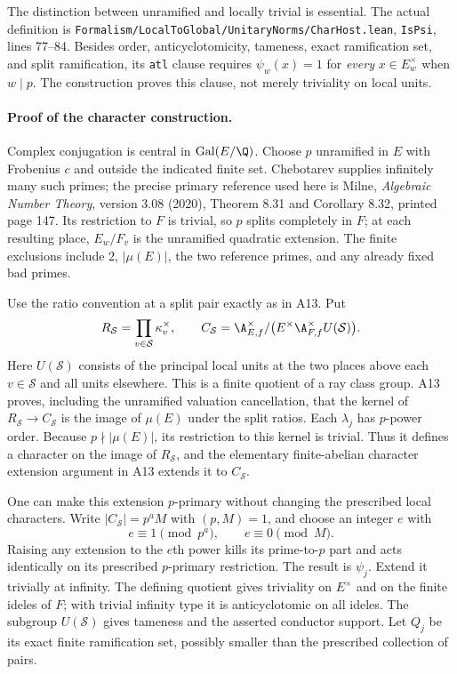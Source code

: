 The distinction between unramified and locally trivial is essential.
The actual definition is
\texttt{Formalism/LocalToGlobal/UnitaryNorms/CharHost.lean},
\texttt{IsPsi}, lines 77--84.  Besides order, anticyclotomicity,
tameness, exact ramification set, and split ramification, its
\texttt{atl} clause requires $\psi_w(x)=1$ for \emph{every}
$x\in E_w^\times$ when $w\mid p$.  The construction proves this clause,
not merely triviality on local units.

\paragraph{Proof of the character construction.}
Complex conjugation is central in $\operatorname{Gal}(E/\Q)$.
Choose $p$ unramified in $E$ with Frobenius $c$ and outside the indicated
finite set.  Chebotarev supplies infinitely many such primes; the precise
primary reference used here is Milne, \emph{Algebraic Number Theory},
version 3.08 (2020), Theorem 8.31 and Corollary 8.32, printed page 147.
Its restriction to $F$ is trivial, so $p$ splits completely in $F$;
at each resulting place, $E_w/F_v$ is the unramified quadratic
extension.  The finite exclusions include $2$, $|\mu(E)|$, the two
reference primes, and any already fixed bad primes.

Use the ratio convention at a split pair exactly as in A13.  Put
\[
 R_{\mathcal S}=\prod_{v\in\mathcal S}\kappa_v^\times,
 \qquad
 C_{\mathcal S}=
 \A_{E,f}^\times/
       \bigl(E^\times\A_{F,f}^\times U(\mathcal S)\bigr).
\]
Here $U(\mathcal S)$ consists of the principal local units at the two
places above each $v\in\mathcal S$ and all units elsewhere.  This is a
finite quotient of a ray class group.  A13 proves, including the
unramified valuation cancellation, that the kernel of
$R_{\mathcal S}\longrightarrow C_{\mathcal S}$ is the image of
$\mu(E)$ under the split ratios.  Each $\lambda_j$ has $p$-power
order.  Because $p\nmid |\mu(E)|$, its restriction to this kernel is
trivial.  Thus it defines a character on the image of
$R_{\mathcal S}$, and the elementary finite-abelian character extension
argument in A13 extends it to $C_{\mathcal S}$.

One can make this extension $p$-primary without changing the prescribed
local characters.  Write
$|C_{\mathcal S}|=p^a M$ with $(p,M)=1$, and choose an integer $e$ with
\[
 e\equiv1\pmod{p^a},\qquad e\equiv0\pmod M.
\]
Raising any extension to the $e$th power kills its prime-to-$p$ part
and acts identically on its prescribed $p$-primary restriction.  The
result is $\psi_j$.  Extend it trivially at infinity.  The defining
quotient gives triviality on $E^\times$ and on the finite ideles of
$F$; with trivial infinity type it is anticyclotomic on all ideles.
The subgroup $U(\mathcal S)$ gives tameness and the asserted conductor
support.  Let $Q_j$ be its exact finite ramification set, possibly
smaller than the prescribed collection of pairs.

